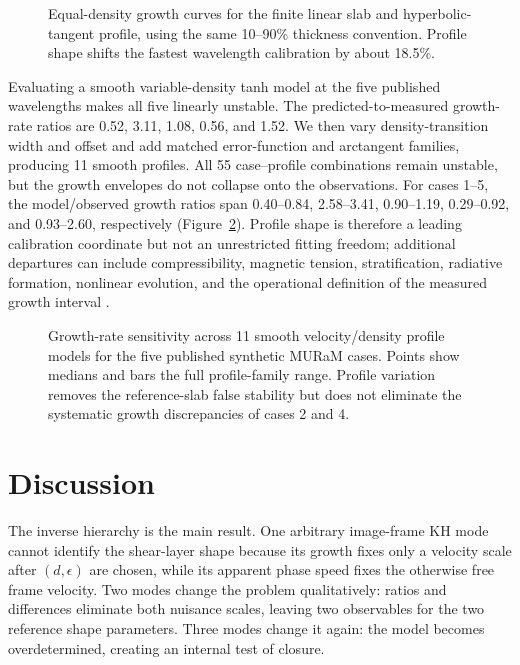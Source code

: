 \documentclass[linenumbers]{aastex7}
\begin{document}
\begin{figure}
\caption{Equal-density growth curves for the finite linear slab and hyperbolic-tangent profile, using the same 10--90\% thickness convention. Profile shape shifts the fastest wavelength calibration by about 18.5\%.}
\label{fig:profile}
\end{figure}

Evaluating a smooth variable-density tanh model at the five published wavelengths makes all five linearly unstable. The predicted-to-measured growth-rate ratios are 0.52, 3.11, 1.08, 0.56, and 1.52. We then vary density-transition width and offset and add matched error-function and arctangent families, producing 11 smooth profiles. All 55 case--profile combinations remain unstable, but the growth envelopes do not collapse onto the observations. For cases 1--5, the model/observed growth ratios span 0.40--0.84, 2.58--3.41, 0.90--1.19, 0.29--0.92, and 0.93--2.60, respectively (Figure~\ref{fig:profile-family}). Profile shape is therefore a leading calibration coordinate but not an unrestricted fitting freedom; additional departures can include compressibility, magnetic tension, stratification, radiative formation, nonlinear evolution, and the operational definition of the measured growth interval \citep{MiuraPritchett1982}.

\begin{figure}
\caption{Growth-rate sensitivity across 11 smooth velocity/density profile models for the five published synthetic MURaM cases. Points show medians and bars the full profile-family range. Profile variation removes the reference-slab false stability but does not eliminate the systematic growth discrepancies of cases 2 and 4.}
\label{fig:profile-family}
\end{figure}

\section{Discussion}
The inverse hierarchy is the main result. One arbitrary image-frame KH mode cannot identify the shear-layer shape because its growth fixes only a velocity scale after $(d,\epsilon)$ are chosen, while its apparent phase speed fixes the otherwise free frame velocity. Two modes change the problem qualitatively: ratios and differences eliminate both nuisance scales, leaving two observables for the two reference shape parameters. Three modes change it again: the model becomes overdetermined, creating an internal test of closure.
\end{document}
